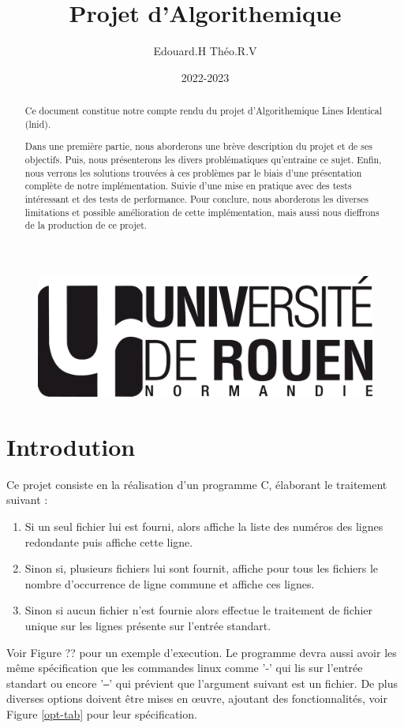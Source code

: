 \documentclass[12pt]{article}
\title{Projet d'Algorithemique}
\author{Edouard.H Théo.R.V}
\date{2022-2023}
\begin{document}
    \begin{figure}
        \includegraphics[scale=0.3, right]{logo-univ-rouen-normandie-noir.png}
    \end{figure}
    
    \maketitle

    \begin{abstract}
        Ce document constitue notre compte rendu du projet d'Algorithemique Lines Identical (lnid).

        Dans une première partie, nous aborderons une brève description du projet et de ses objectifs.     
        Puis, nous présenterons les divers problématiques qu'entraine ce sujet.
        Enfin, nous verrons les solutions trouvées à ces problèmes par le biais d'une présentation complète de notre implémentation. Suivie d'une mise en pratique avec des tests intéressant et des tests de performance. Pour conclure, nous aborderons les diverses limitations et possible amélioration de cette implémentation, mais aussi nous dieffrons de la production de ce projet.
    \end{abstract}

    \tableofcontents
    
    \newpage

    \section{Introdution}
        Ce projet consiste en la réalisation d'un programme C, élaborant le traitement suivant : 
        \begin{enumerate}
            \item[] Si un seul fichier lui est fourni, alors affiche la liste des numéros des lignes redondante puis affiche cette ligne.
            \item[] Sinon si, plusieurs fichiers lui sont fournit, affiche pour tous les fichiers le nombre d'occurrence de ligne commune et affiche ces lignes.
            \item[] Sinon si aucun fichier n'est fournie alors effectue le traitement de fichier unique sur les lignes présente sur l'entrée standart.
        \end{enumerate}
        Voir Figure ?? pour un exemple d'execution. Le programme devra aussi avoir les même spécification que les commandes linux comme '-' qui lis sur l'entrée standart ou encore '\texttt{--}' qui prévient que l'argument suivant est un fichier.
       De plus diverses options doivent être mises en œuvre, ajoutant des fonctionnalités, voir Figure \ref{opt-tab} pour leur spécification.
       
\end{document}
